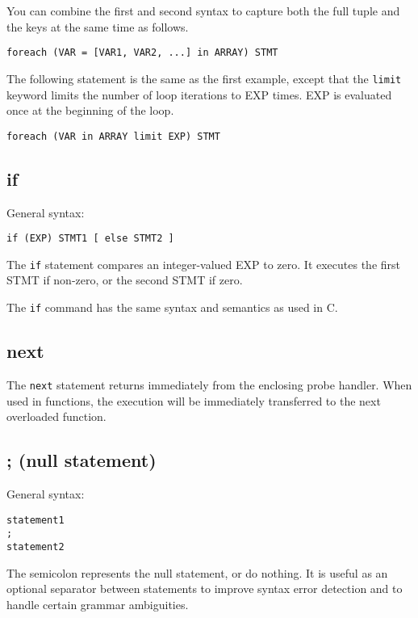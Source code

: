 \documentclass[twoside,english]{article}
\newenvironment{vindent}
{\begin{list}{}{\setlength{\listparindent}{6pt}}
\item[]}
{\end{list}}
\begin{document}
You can combine the first and second syntax to capture both the full tuple
and the keys at the same time as follows.
\begin{vindent}
\begin{verbatim}
foreach (VAR = [VAR1, VAR2, ...] in ARRAY) STMT
\end{verbatim}
\end{vindent}

The following statement is the same as the first example, except that the
\texttt{limit} keyword limits the number of loop iterations to EXP times.
EXP is evaluated once at the beginning of the loop.

\begin{vindent}
\begin{verbatim}
foreach (VAR in ARRAY limit EXP) STMT
\end{verbatim}
\end{vindent}

\subsection{if}
General syntax:

\begin{vindent}
\begin{verbatim}
if (EXP) STMT1 [ else STMT2 ]
\end{verbatim}
\end{vindent}
The \texttt{if} statement compares an integer-valued EXP to zero. It executes
the first STMT if non-zero, or the second STMT if zero.

The \texttt{if} command has the same syntax and semantics as used in C.


\subsection{next}
The \texttt{next} statement returns immediately from the enclosing probe
handler. When used in functions, the execution will be immediately transferred
to the next overloaded function.


\subsection{; (null statement)}
\index{;}
General syntax:

\begin{vindent}
\begin{verbatim}
statement1
;
statement2
\end{verbatim}
\end{vindent}
The semicolon represents the null statement, or do nothing. It is useful
as an optional separator between statements to improve syntax error detection
and to handle certain grammar ambiguities.
\end{document}
